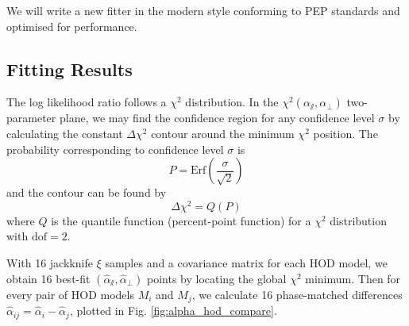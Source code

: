 \documentclass[10pt,A4]{aastex62}
\begin{document}
		We will write a new fitter in the modern style conforming to PEP standards and optimised for performance.
		
	\subsection{Fitting Results}
	
		The log likelihood ratio follows a $\chi^2$ distribution. In the $\chi^2 (\alpha_\varparallel, \alpha_\perp)$ two-parameter plane, we may find the confidence region for any confidence level $\sigma$ by calculating the constant $\Delta\chi^2$ contour around the minimum $\chi^2$ position. The probability corresponding to confidence level $\sigma$ is
		\begin{equation}
			P = \mathrm{Erf} ( \frac{\sigma}{\sqrt{2}} )
		\end{equation}
		and the contour can be found by
		\begin{equation}
			\Delta \chi^2 = Q(P)
		\end{equation}
		where $Q$ is the quantile function (percent-point function) for a $\chi^2$ distribution with $\mathrm{dof}=2$.
		
		With 16 jackknife $\xi$ samples and a covariance matrix for each HOD model, we obtain 16 best-fit $ (\hat{\alpha}_\varparallel, \hat{\alpha}_\perp) $ points by locating the global $\chi^2$ minimum. Then for every pair of HOD models $M_i$ and $M_j$, we calculate 16 phase-matched differences $\hat{\alpha}_{ij} = \hat{\alpha}_i - \hat{\alpha}_j$, plotted in Fig. \ref{fig:alpha_hod_compare}.
		
\end{document}
